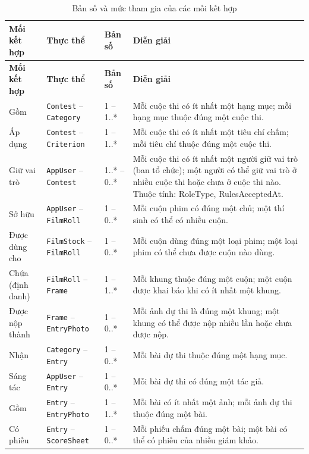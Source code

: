 \begin{longtable}{|L{2.5cm}|L{3.5cm}|L{1.9cm}|L{6.1cm}|}
\caption{Bản số và mức tham gia của các mối kết hợp} \label{tab:ban-so} \\
\hline
\textbf{Mối kết hợp} & \textbf{Thực thể} & \textbf{Bản số} & \textbf{Diễn giải} \\ \hline
\endfirsthead
\hline
\textbf{Mối kết hợp} & \textbf{Thực thể} & \textbf{Bản số} & \textbf{Diễn giải} \\ \hline
\endhead
Gồm & \texttt{Contest} -- \texttt{Category} & 1 -- 1..* & Mỗi cuộc thi có ít nhất một hạng mục; mỗi hạng mục thuộc đúng một cuộc thi. \\ \hline
Áp dụng & \texttt{Contest} -- \texttt{Criterion} & 1 -- 1..* & Mỗi cuộc thi có ít nhất một tiêu chí chấm; mỗi tiêu chí thuộc đúng một cuộc thi. \\ \hline
Giữ vai trò & \texttt{AppUser} -- \texttt{Contest} & 1..* -- 0..* & Mỗi cuộc thi có ít nhất một người giữ vai trò (ban tổ chức); một người có thể giữ vai trò ở nhiều cuộc thi hoặc chưa ở cuộc thi nào. Thuộc tính: RoleType, RulesAcceptedAt. \\ \hline
Sở hữu & \texttt{AppUser} -- \texttt{FilmRoll} & 1 -- 0..* & Mỗi cuộn phim có đúng một chủ; một thí sinh có thể có nhiều cuộn. \\ \hline
Được dùng cho & \texttt{FilmStock} -- \texttt{FilmRoll} & 1 -- 0..* & Mỗi cuộn dùng đúng một loại phim; một loại phim có thể chưa được cuộn nào dùng. \\ \hline
Chứa (định danh) & \texttt{FilmRoll} -- \texttt{Frame} & 1 -- 1..* & Mỗi khung thuộc đúng một cuộn; một cuộn được khai báo khi có ít nhất một khung. \\ \hline
Được nộp thành & \texttt{Frame} -- \texttt{EntryPhoto} & 1 -- 0..* & Mỗi ảnh dự thi là đúng một khung; một khung có thể được nộp nhiều lần hoặc chưa được nộp. \\ \hline
Nhận & \texttt{Category} -- \texttt{Entry} & 1 -- 0..* & Mỗi bài dự thi thuộc đúng một hạng mục. \\ \hline
Sáng tác & \texttt{AppUser} -- \texttt{Entry} & 1 -- 0..* & Mỗi bài dự thi có đúng một tác giả. \\ \hline
Gồm & \texttt{Entry} -- \texttt{EntryPhoto} & 1 -- 1..* & Mỗi bài có ít nhất một ảnh; mỗi ảnh dự thi thuộc đúng một bài. \\ \hline
Có phiếu & \texttt{Entry} -- \texttt{ScoreSheet} & 1 -- 0..* & Mỗi phiếu chấm đúng một bài; một bài có thể có phiếu của nhiều giám khảo. \\ \hline

\end{longtable}
